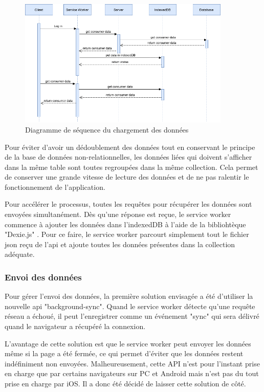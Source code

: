 \documentclass{EPL-master-thesis-covers-FR}
\begin{document}
					\begin{figure}[H]
						\centering
						\includegraphics[width=0.9\textwidth]{images/flow}
						\caption{Diagramme de séquence du chargement des données}
						\label{fig:recuparation}
					\end{figure}
				
					Pour éviter d'avoir un dédoublement des données tout en conservant le principe de la base de données non-relationnelles, les données liées qui doivent s'afficher dans la même table sont toutes regroupées dans la même collection. Cela permet de conserver une grande vitesse de lecture des données et de ne pas ralentir le fonctionnement de l'application.
							
					Pour accélérer le processus, toutes les requêtes pour récupérer les données sont envoyées simultanément. Dès qu'une réponse est reçue, le service worker commence à ajouter les données dans l'indexedDB à l'aide de la bibliohtèque "Dexie.js" \cite{ref:dexie}. Pour ce faire, le service worker parcourt simplement tout le fichier \gls{json} reçu de l'\gls{api} et ajoute toutes les données présentes dans la collection adéquate.
				
				\subsubsection*{Envoi des données}
					Pour gérer l'envoi des données, la première solution envisagée a été d'utiliser la nouvelle \gls{api} "background-sync". Quand le service worker détecte qu'une requête réseau a échoué, il peut l'enregistrer comme un événement "sync" qui sera délivré quand le navigateur a récupéré la connexion. 
					
					L'avantage de cette solution est que le service worker peut envoyer les données même si la page a été fermée, ce qui permet d'éviter que les données restent indéfiniment non envoyées. Malheureusement, cette API n'est pour l'instant prise en charge que par certains navigateurs sur PC et Android mais n'est pas du tout prise en charge par iOS. Il a donc été décidé de laisser cette solution de côté.
					
\end{document}
